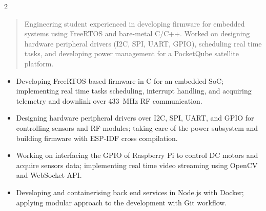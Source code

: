 \documentclass[10pt,a4paper,ragged2e,withhyper]{altacv}
\begin{document}
\begin{paracol}{2}

        \newpage

        \switchcolumn

            \begin{quote}
            Engineering student experienced in developing firmware for embedded systems using FreeRTOS and bare-metal C/C++. Worked on designing hardware peripheral drivers (I2C, SPI, UART, GPIO), scheduling real time tasks, and developing power management for a PocketQube satellite platform.
            \end{quote}

            \begin{itemize}
                \item Developing FreeRTOS based firmware in C for an embedded SoC; implementing real time tasks scheduling, interrupt handling, and acquiring telemetry and downlink over 433~MHz RF communication.
                \item Designing hardware peripheral drivers over I2C, SPI, UART, and GPIO for controlling sensors and RF modules; taking care of the power subsystem and building firmware with ESP-IDF cross compilation.
            \end{itemize}

            \begin{itemize}
                \item Working on interfacing the GPIO of Raspberry Pi to control DC motors and acquire sensors data; implementing real time video streaming using OpenCV and WebSocket API.
            \end{itemize}

            \begin{itemize}
                \item Developing and containerising back end services in Node.js with Docker; applying modular approach to the development with Git workflow.
            \end{itemize}
            \divider


\end{paracol}
\end{document}

